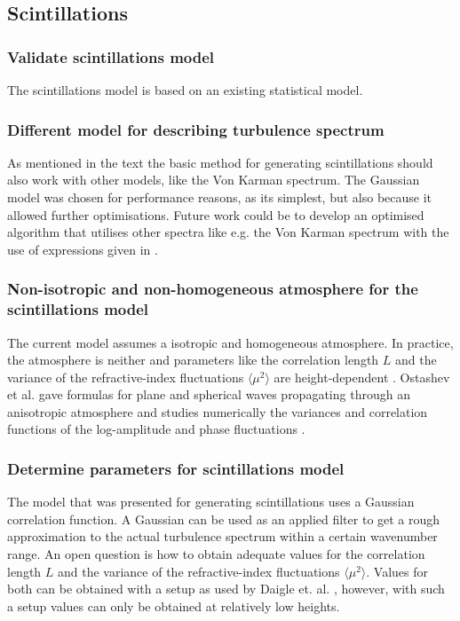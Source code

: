 \subsection{Scintillations}

\subsubsection*{Validate scintillations model}
The scintillations model is based on an existing statistical model.

\subsubsection*{Different model for describing turbulence spectrum}
As mentioned in the text the basic method for generating scintillations should
also work with other models, like the Von Karman spectrum. The Gaussian model
was chosen for performance reasons, as its simplest, but also because it allowed
further optimisations. Future work could be to develop an optimised algorithm
that utilises other spectra like e.g. the Von Karman spectrum with the use of
expressions given in \cite{Ostashev2015}.

\subsubsection*{Non-isotropic and non-homogeneous atmosphere for the scintillations model}
The current model assumes a isotropic and homogeneous atmosphere. In practice,
the atmosphere is neither and parameters like the correlation length $L$ and the
variance of the refractive-index fluctuations $\langle \mu^2 \rangle$ are
height-dependent \cite{Krasnenko2013}. Ostashev et al. gave formulas for plane
\cite{Ostashev1997b} and spherical \cite{Ostashev1997c} waves propagating
through an anisotropic atmosphere and studies numerically the variances and
correlation functions of the log-amplitude and phase fluctuations
\cite{Ostashev2004}.

\subsubsection*{Determine parameters for scintillations model}
The model that was presented for generating scintillations uses a Gaussian
correlation function. A Gaussian can be used as an applied filter to get a rough
approximation to the actual turbulence spectrum within a certain wavenumber
range. An open question is how to obtain adequate values for the correlation
length $L$ and the variance of the refractive-index fluctuations $\langle \mu^2
\rangle$. Values for both can be obtained with a setup as used by Daigle et. al.
\cite{Daigle1983}, however, with such a setup values can only be obtained at
relatively low heights.




